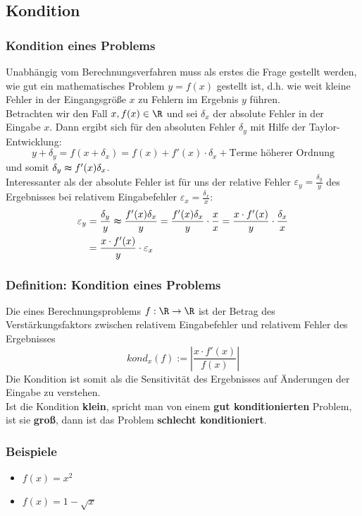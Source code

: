 \subsection{Kondition}
%
\begin{frame}\frametitle{Kondition eines Problems}
Unabhängig vom Berechnungsverfahren muss als erstes die Frage gestellt werden, wie gut ein mathematisches Problem $y=f(x)$ gestellt ist, d.h. wie weit kleine Fehler in der Eingangsgröße $x$ zu Fehlern im Ergebnis $y$ führen.\pause\\
Betrachten wir den Fall $x,f(x) \in \R$ und sei $\delta_x$ der absolute Fehler in der Eingabe $x$. Dann ergibt sich für den absoluten Fehler $\delta_y$ mit Hilfe der Taylor-Entwicklung:
$$
y+\delta_y=f(x+\delta_x)=f(x)+f'(x)\cdot \delta_x + \text{Terme höherer Ordnung}
$$
und somit $\delta_y \thickapprox f'(x)\delta_x$.\pause\\
Interessanter als der absolute Fehler ist für uns der relative Fehler $\varepsilon_y=\frac{\delta_y}{y}$ des Ergebnisses bei relativem Eingabefehler $\varepsilon_x=\frac{\delta_x}{x}$:
\begin{align*}
\varepsilon_y&=\frac{\delta_y}{y}\thickapprox \frac{f'(x)\delta_x}{y}=\frac{f'(x)\delta_x}{y}\cdot \frac{x}{x}=\frac{x\cdot f'(x)}{y}\cdot \frac{\delta_x}{x}\\&=\frac{x\cdot f'(x)}{y}\cdot \varepsilon_x
\end{align*}
\end{frame}
%
%
\begin{frame}\frametitle{Definition: Kondition eines Problems}
Die  eines Berechnungsproblems $f:\R \to \R$ ist der Betrag des Verstärkungsfaktors zwischen relativem Eingabefehler und relativem Fehler des Ergebnisses
$$
kond_x(f):=\left| \frac{x\cdot f'(x)}{f(x)} \right|
$$ \pause
Die Kondition ist somit als die Sensitivität des Ergebnisses auf Änderungen der Eingabe zu verstehen.\\
Ist die Kondition \textbf{klein}, spricht man von einem \textbf{gut konditionierten} Problem, ist sie \textbf{groß}, dann ist das Problem \textbf{schlecht konditioniert}.
\end{frame}
%
\begin{frame}\frametitle{Beispiele}
\begin{itemize}
\item $f(x)=x^2$ 
\item $f(x)=1-\sqrt{x}$
\end{itemize}

\end{frame}
